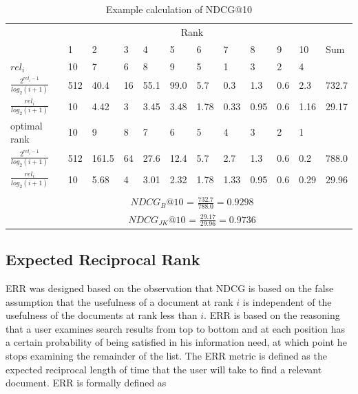 \begin{table}[!h]
\begin{tabular}{llllllllllll}
 & \multicolumn{10}{c}{Rank} &  \\ 
\cline{2-11}
 & 1 & 2 & 3 & 4 & 5 & 6 & 7 & 8 & 9 & 10 & Sum \\ 
\hline
\hline
$rel_i$ & 10 & 7 & 6 & 8 & 9 & 5 & 1 & 3 & 2 & 4 &  \\
\hline
$\frac{2^{rel_i-1}}{log_2(i+1)}$ & 512 & 40.4 & 16 & 55.1 & 99.0 & 5.7 & 0.3 & 1.3 & 0.6 & 2.3 & 732.7 \\
\hline
$\frac{rel_i}{log_2(i+1)}$ & 10 & 4.42 & 3 & 3.45 & 3.48 & 1.78 & 0.33 & 0.95 & 0.6 & 1.16 & 29.17 \\  
\hline
\hline
optimal rank & 10 & 9 & 8 & 7 & 6 & 5 & 4 & 3 & 2 & 1 &  \\
\hline 
$\frac{2^{rel_i-1}}{log_2(i+1)}$ & 512 & 161.5 & 64 & 27.6 & 12.4 & 5.7 & 2.7 & 1.3 & 0.6 & 0.2 & 788.0 \\
\hline
$\frac{rel_i}{log_2(i+1)}$ & 10 & 5.68 & 4 & 3.01 & 2.32 & 1.78 & 1.33 & 0.95 & 0.6 & 0.29 & 29.96 \\   
\hline
 &  &  &  &  &  &  &  &  &  &  &  \\
  & \multicolumn{10}{c}{$NDCG_{B}@10$ = $\frac{732.7}{788.0} = 0.9298$} &  \\ 
  & \multicolumn{10}{c}{$NDCG_{JK}@10$ = $\frac{29.17}{29.96} = 0.9736$} &  \\
\end{tabular}
\caption{Example calculation of \acs{NDCG}@10}
\label{tab:example_calculation_NDCG}
\end{table}

\subsection{Expected Reciprocal Rank}
\ac{ERR} \cite{Chapelle2009} was designed based on the observation that \ac{NDCG} is based on the false assumption that the usefulness of a document at rank $i$ is independent of the usefulness of the documents at rank less than $i$. \ac{ERR} is based on the reasoning that a user examines search results from top to bottom and at each position has a certain probability of being satisfied in his information need, at which point he stops examining the remainder of the list. The \ac{ERR} metric is defined as the expected reciprocal length of time that the user will take to find a relevant document. \ac{ERR} is formally defined as\\

